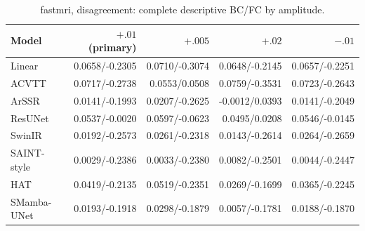 \begin{table}[t]\centering\scriptsize

\caption{fastmri, disagreement: complete descriptive BC/FC by amplitude.}

\begin{tabular}{lrrrr}\toprule Model & $+.01$ (primary) & $+.005$ & $+.02$ & $-.01$\\\midrule

Linear & 0.0658/-0.2305 & 0.0710/-0.3074 & 0.0648/-0.2145 & 0.0657/-0.2251\\

ACVTT & 0.0717/-0.2738 & 0.0553/0.0508 & 0.0759/-0.3531 & 0.0723/-0.2643\\

ArSSR & 0.0141/-0.1993 & 0.0207/-0.2625 & -0.0012/0.0393 & 0.0141/-0.2049\\

ResUNet & 0.0537/-0.0020 & 0.0597/-0.0623 & 0.0495/0.0208 & 0.0546/-0.0145\\

SwinIR & 0.0192/-0.2573 & 0.0261/-0.2318 & 0.0143/-0.2614 & 0.0264/-0.2659\\

SAINT-style & 0.0029/-0.2386 & 0.0033/-0.2380 & 0.0082/-0.2501 & 0.0044/-0.2447\\

HAT & 0.0419/-0.2135 & 0.0519/-0.2351 & 0.0269/-0.1699 & 0.0365/-0.2245\\

SMamba-UNet & 0.0193/-0.1918 & 0.0298/-0.1879 & 0.0057/-0.1781 & 0.0188/-0.1870\\

\bottomrule\end{tabular}\end{table}


